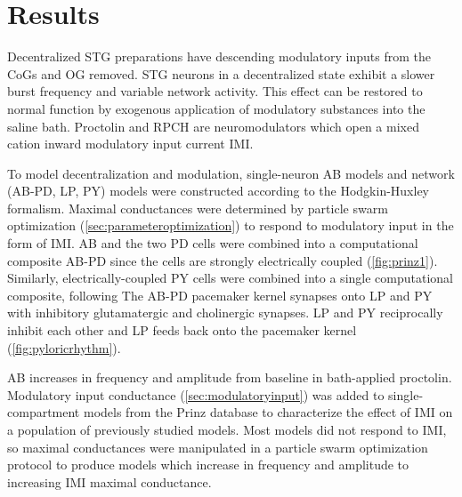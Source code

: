 \chapter{Results}\label{ch:results} %
Decentralized \acs{STG} preparations have descending modulatory inputs from the \acsp{CoG} and \acs{OG} removed. \acs{STG} neurons in a decentralized state exhibit a slower burst frequency and variable network activity\autocite{HamoodAnimaltoanimalvariabilityneuromodulation2014, HamoodConsequencesacutelongterm2015}. This effect can be restored to normal function by exogenous application of modulatory substances into the saline bath\autocite{SwensenModulatorsconvergentcellular2001, SharpDynamicclampcomputergenerated1993}. Proctolin and \acs{RPCH} are neuromodulators which open a mixed cation inward modulatory input current \ac{IMI}\autocite{SwensenModulatorsconvergentcellular2001}. 

To model decentralization and modulation, single-neuron \ac{AB} models and network (\acs{AB}-\acs{PD}, \acs{LP}, \acs{PY}) models were constructed according to the Hodgkin-Huxley formalism\autocite{PrinzAlternativehandtuningconductancebased2003, PrinzSimilarnetworkactivity2004, HodgkinMeasurementcurrentvoltagerelations1952, Hodgkincomponentsmembraneconductance1952, Hodgkinquantitativedescriptionmembrane1952}. Maximal conductances were determined by particle swarm optimization (\autoref{sec:parameteroptimization}) to respond to modulatory input in the form of \acs{IMI}\autocite{SwensenModulatorsconvergentcellular2001}. \acs{AB} and the two \acs{PD} cells were combined into a computational composite \acs{AB}-\acs{PD} since the cells are strongly electrically coupled (\autoref{fig:prinz1}). Similarly, electrically-coupled \acs{PY} cells were combined into a single computational composite, following \citeauthor{PrinzSimilarnetworkactivity2004}\autocite{PrinzSimilarnetworkactivity2004} The \acs{AB}-\acs{PD} pacemaker kernel synapses onto \acs{LP} and \acs{PY} with inhibitory glutamatergic and cholinergic synapses. \acs{LP} and \acs{PY} reciprocally inhibit each other and \acs{LP} feeds back onto the pacemaker kernel (\autoref{fig:pyloricrhythm}).

\acs{AB} increases in frequency and amplitude from baseline in bath-applied proctolin\autocite{SharpDynamicclampcomputergenerated1993, SwensenMultiplepeptidesconverge2000, SwensenModulatorsconvergentcellular2001, GolowaschProctolinactivatesinward1992}. Modulatory input conductance (\autoref{sec:modulatoryinput}) was added to single-compartment models from the Prinz database\autocite{PrinzAlternativehandtuningconductancebased2003} to characterize the effect of \acs{IMI} on a population of previously studied models. Most models did not respond to \acs{IMI}, so maximal conductances were manipulated in a particle swarm optimization protocol to produce models which increase in frequency and amplitude to increasing \acs{IMI} maximal conductance\autocite{NusbaumNeuronalRoleCrustacean1988,SharpDynamicclampcomputergenerated1993}.


